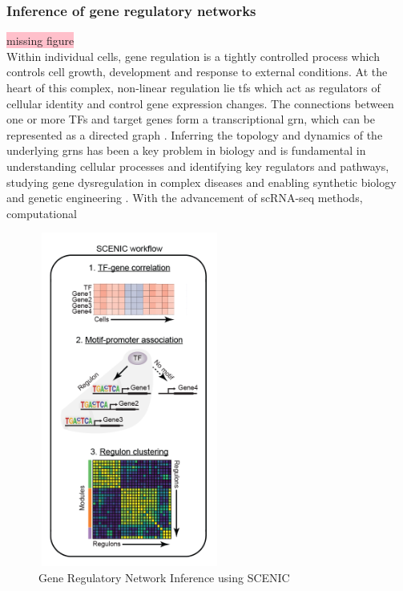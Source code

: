 \subsubsection{Inference of gene regulatory networks}
\colorbox{pink}{missing figure}\\
Within individual cells, gene regulation is a tightly controlled process which controls cell growth, development and response to external conditions. At the heart of this complex, non-linear regulation lie \glspl{tf} which act as regulators of cellular identity and control gene expression changes. The connections between one or more TFs and target genes form a transcriptional \gls{grn}, which can be represented as a directed graph \textbf{\cite{skok_gibbs_high-performance_2022}}. Inferring the topology and dynamics of the underlying \glspl{grn} has been a key problem in biology and is fundamental in understanding cellular processes and identifying key regulators and pathways, studying gene dysregulation in complex diseases and enabling synthetic biology and genetic engineering \textbf{\cite{lueckenmalte_d_current_2019,skok_gibbs_high-performance_2022,huang_scgrn_2024}}. With the advancement of scRNA-seq methods, computational

\begin{figure}
\centering
\includegraphics[width=6cm,height=11cm,]{Chapter1/Fig/F3-8-01.png}
\caption[sec1-4tgrn]{Gene Regulatory Network Inference using SCENIC}
\label{fig:grn_workflow}
\end{figure}


